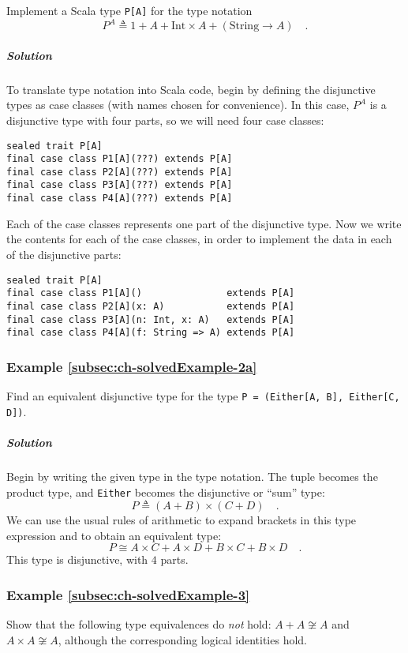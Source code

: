 Implement a Scala type \lstinline!P[A]! for the type notation 
\[
P^{A}\triangleq1+A+\text{Int}\times A+(\text{String}\rightarrow A)\quad.
\]


\subparagraph{Solution}

To translate type notation into Scala code, begin by defining the
disjunctive types as case classes (with names chosen for convenience).
In this case, $P^{A}$ is a disjunctive type with four parts, so we
will need four case classes:
\begin{lstlisting}
sealed trait P[A]
final case class P1[A](???) extends P[A]
final case class P2[A](???) extends P[A]
final case class P3[A](???) extends P[A]
final case class P4[A](???) extends P[A]
\end{lstlisting}
Each of the case classes represents one part of the disjunctive type.
Now we write the contents for each of the case classes, in order to
implement the data in each of the disjunctive parts:
\begin{lstlisting}
sealed trait P[A]
final case class P1[A]()               extends P[A]
final case class P2[A](x: A)           extends P[A]
final case class P3[A](n: Int, x: A)   extends P[A]
final case class P4[A](f: String => A) extends P[A]
\end{lstlisting}


\subsubsection{Example \label{subsec:ch-solvedExample-2a}\ref{subsec:ch-solvedExample-2a}}

Find an equivalent disjunctive type for the type \lstinline!P = (Either[A, B], Either[C, D])!.

\subparagraph{Solution}

Begin by writing the given type in the type notation. The tuple becomes
the product type, and \lstinline!Either! becomes the disjunctive
or ``sum'' type:
\[
P\triangleq(A+B)\times(C+D)\quad.
\]
We can use the usual rules of arithmetic to expand brackets in this
type expression and to obtain an equivalent type:
\[
P\cong A\times C+A\times D+B\times C+B\times D\quad.
\]
This type is disjunctive, with $4$ parts.

\subsubsection{Example \label{subsec:ch-solvedExample-3}\ref{subsec:ch-solvedExample-3}}

Show that the following type equivalences do \emph{not} hold: $A+A\not\cong A$
and $A\times A\not\cong A$, although the corresponding logical identities
hold.

